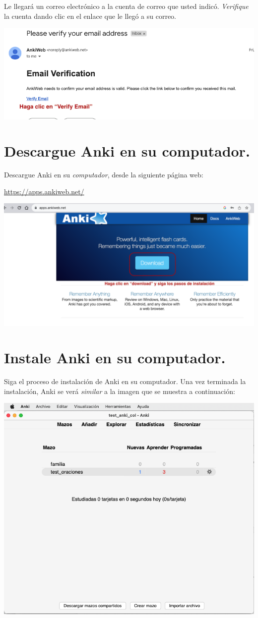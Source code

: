 \documentclass[
]{book}
\begin{document}
Le llegará un correo electrónico a la cuenta de correo que usted indicó. \emph{Verifique} la cuenta dando clic en el enlace que le llegó a su correo.

\includegraphics[width=0.9\linewidth]{images/reposit_sp/email_verification}

\hypertarget{descargue-anki-en-su-computador.}{%
\section{Descargue Anki en su computador.}\label{descargue-anki-en-su-computador.}}

Descargue Anki en su \emph{computador}, desde la siguiente página web:

\url{https://apps.ankiweb.net/}

\includegraphics[width=0.6\linewidth]{images/reposit_sp/download}

\hypertarget{instale-anki-en-su-computador.}{%
\section{Instale Anki en su computador.}\label{instale-anki-en-su-computador.}}

Siga el proceso de instalación de Anki en su computador. Una vez terminada la instalación, Anki se verá \emph{similar} a la imagen que se muestra a continuación:

\includegraphics[width=0.6\linewidth]{images/reposit_sp/anki_screen}
\end{document}
